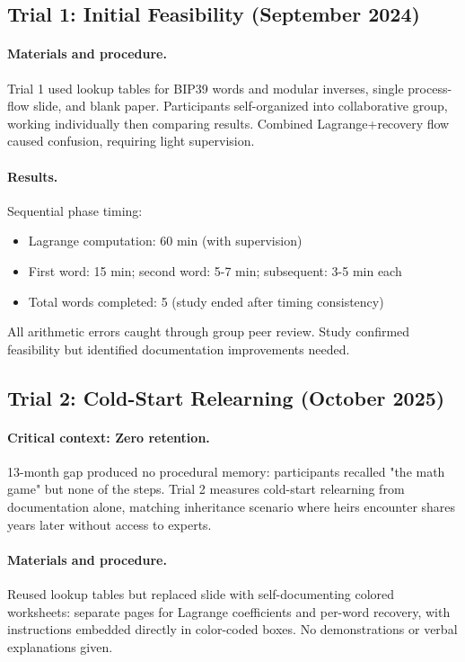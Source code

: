 \documentclass[11pt]{article}
\begin{document}
\subsection{Trial 1: Initial Feasibility (September 2024)}

\paragraph{Materials and procedure.} Trial 1 used lookup tables for BIP39 words and modular inverses, single process-flow slide, and blank paper. Participants self-organized into collaborative group, working individually then comparing results. Combined Lagrange+recovery flow caused confusion, requiring light supervision.

\paragraph{Results.} Sequential phase timing:
\begin{itemize}[noitemsep]
    \item Lagrange computation: 60 min (with supervision)
    \item First word: 15 min; second word: 5-7 min; subsequent: 3-5 min each
    \item Total words completed: 5 (study ended after timing consistency)
\end{itemize}

All arithmetic errors caught through group peer review. Study confirmed feasibility but identified documentation improvements needed.

\subsection{Trial 2: Cold-Start Relearning (October 2025)}

\paragraph{Critical context: Zero retention.} 13-month gap produced no procedural memory: participants recalled "the math game" but none of the steps. Trial 2 measures cold-start relearning from documentation alone, matching inheritance scenario where heirs encounter shares years later without access to experts.

\paragraph{Materials and procedure.} Reused lookup tables but replaced slide with self-documenting colored worksheets: separate pages for Lagrange coefficients and per-word recovery, with instructions embedded directly in color-coded boxes. No demonstrations or verbal explanations given.
\end{document}
